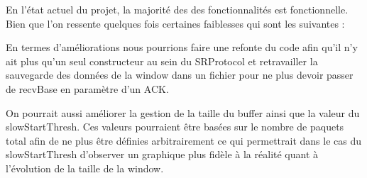 \documentclass[../rapport.tex]{subfiles}
\begin{document}
	
	En l'état actuel du projet, la majorité des des fonctionnalités est fonctionnelle. Bien que l'on ressente quelques fois certaines faiblesses qui sont les suivantes :

	\medskip

	En termes d'améliorations nous pourrions faire une refonte du code afin qu'il n'y ait plus qu'un seul constructeur au sein du SRProtocol et retravailler la sauvegarde des données de la window
	dans un fichier pour ne plus devoir passer de recvBase en paramètre d'un ACK. 

	\medskip

	On pourrait aussi améliorer la gestion de la taille du buffer ainsi que la valeur du slowStartThresh. Ces valeurs pourraient être basées sur le nombre de paquets total afin de ne plus 
	être définies arbitrairement ce qui permettrait dans le cas du slowStartThresh d'observer un graphique plus fidèle à la réalité quant à l'évolution de la taille de la window.
\end{document}
